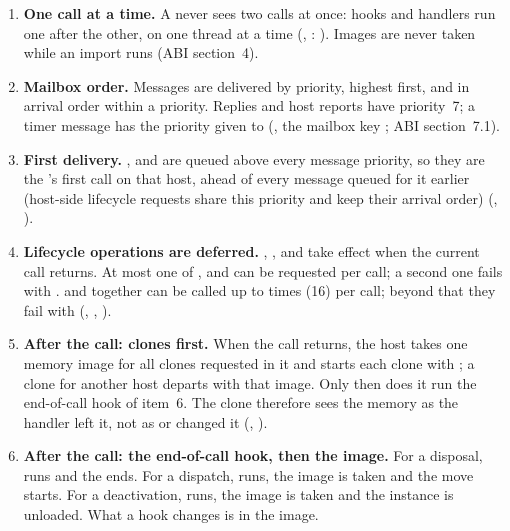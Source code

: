 \begin{enumerate}[leftmargin=2em]
\item \textbf{One call at a time.} A \paglet{} never sees two calls at once:
  hooks and handlers run one after the other, on one thread at a time
  (, : ). Images are
  never taken while an import runs (ABI section~4).
\item \textbf{Mailbox order.} Messages are delivered by priority, highest
  first, and in arrival order within a priority. Replies and host reports
  have priority~7; a timer message has the priority given to 
  (, the mailbox key ; ABI
  section~7.1).
\item \textbf{First delivery.} ,  and
   are queued above every message priority, so they are the
  \paglet{}'s first call on that host, ahead of every message queued for it
  earlier (host-side lifecycle requests share this priority and keep their
  arrival order) (, ).
\item \textbf{Lifecycle operations are deferred.} ,
  ,  and  take effect when the
  current call returns. At most one of
  ,  and  can be requested
  per call; a second one fails with .  and
   together can be called up to
   times (16) per call; beyond that they fail
  with  (, ,
  ).
\item \textbf{After the call: clones first.} When the call returns, the
  host takes one memory image for all clones requested in it and starts
  each clone with ; a clone for another host departs with
  that image. Only then does it run the end-of-call hook of item~6. The
  clone therefore sees the memory as the handler left it, not as
   or  changed it
  (, ).
\item \textbf{After the call: the end-of-call hook, then the image.}
  For a disposal,  runs and the \paglet{} ends. For a
  dispatch,  runs, the image is taken and the move
  starts. For a deactivation,  runs, the image is
  taken and the instance is unloaded. What a hook changes is in the image.

\end{enumerate}

